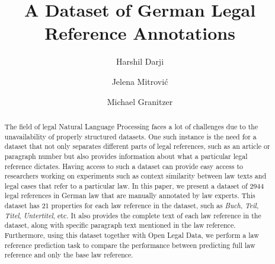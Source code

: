 \documentclass[sigconf]{acmart}
\begin{document}
\title{A Dataset of German Legal Reference Annotations}

\author{Harshil Darji}

\author{Jelena Mitrović}

\author{Michael Granitzer}


\renewcommand{\shortauthors}{Darji et al.}

\begin{abstract}
The field of legal Natural Language Processing faces a lot of challenges due to the unavailability of properly structured datasets. One such instance is the need for a dataset that not only separates different parts of legal references, such as an article or paragraph number but also provides information about what a particular legal reference dictates. Having access to such a dataset can provide easy access to researchers working on experiments such as context similarity between law texts and legal cases that refer to a particular law. In this paper, we present a dataset of 2944 legal references in German law that are manually annotated by law experts. This dataset has 21 properties for each law reference in the dataset, such as \textit{Buch}, \textit{Teil}, \textit{Titel}, \textit{Untertitel}, etc. It also provides the complete text of each law reference in the dataset, along with specific paragraph text mentioned in the law reference. Furthermore, using this dataset together with Open Legal Data, we perform a law reference prediction task to compare the performance between predicting full law reference and only the base law reference.
\end{abstract}
\end{document}
